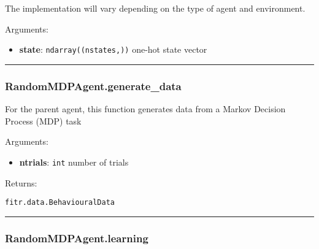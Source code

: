 The implementation will vary depending on the type of agent and
environment.

Arguments:

\begin{itemize}
\tightlist
\item
  \textbf{state}: \texttt{ndarray((nstates,))} one-hot state vector
\end{itemize}

\begin{center}\rule{0.5\linewidth}{\linethickness}\end{center}

\hypertarget{randommdpagent.generate_data}{%
\subsubsection{RandomMDPAgent.generate\_data}\label{randommdpagent.generate_data}}

\begin{Shaded}
\begin{Highlighting}[]
\end{Highlighting}
\end{Shaded}

For the parent agent, this function generates data from a Markov
Decision Process (MDP) task

Arguments:

\begin{itemize}
\tightlist
\item
  \textbf{ntrials}: \texttt{int} number of trials
\end{itemize}

Returns:

\texttt{fitr.data.BehaviouralData}

\begin{center}\rule{0.5\linewidth}{\linethickness}\end{center}

\hypertarget{randommdpagent.learning}{%
\subsubsection{RandomMDPAgent.learning}\label{randommdpagent.learning}}

\begin{Shaded}
\begin{Highlighting}[]
\end{Highlighting}
\end{Shaded}

